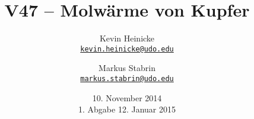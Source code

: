 



\title{%
    V47 -- Molwärme von Kupfer
}
\author{%
    Kevin Heinicke\\
    \texttt{\href{mailto:kevin.heinicke@udo.edu}{kevin.heinicke@udo.edu}}
    \and
    Markus Stabrin\\
    \texttt{\href{mailto:markus.stabrin@udo.edu}{markus.stabrin@udo.edu}}
}
\date{%
    10. November 2014\\
    {\small 1. Abgabe} 12. Januar 2015
}

    \maketitle%
    \tableofcontents
    \newpage

    
    
    
    \printbibliography

